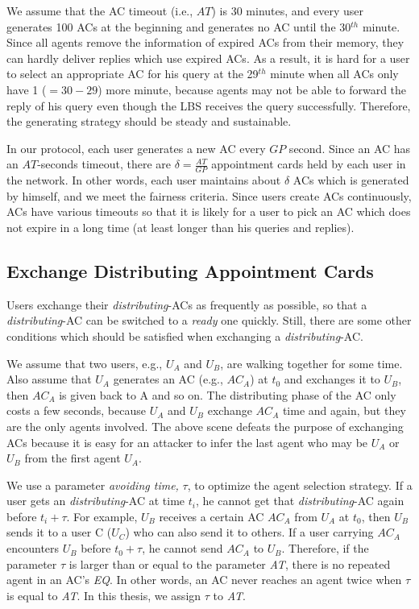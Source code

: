 \documentclass[conference]{IEEEtran}
\begin{document}
We assume that the AC timeout (i.e., $AT$) is 30 minutes, and every user generates 100 ACs at the beginning and generates no AC until the 30${}^{th}$ minute. Since all agents remove the information of expired ACs from their memory, they can hardly deliver replies which use expired ACs. As a result, it is hard for a user to select an appropriate AC for his query at the 29${}^{th}$ minute when all ACs only have 1 ($=30-29$) more minute, because agents may not be able to forward the reply of his query even though the LBS receives the query successfully. Therefore, the generating strategy should be steady and sustainable.

In our protocol, each user generates a new AC every $GP$ second. Since an AC has an $AT$-seconds timeout, there are $\delta =\frac{AT}{GP}$ appointment cards held by each user in the network. In other words, each user maintains about $\delta$ ACs which is generated by himself, and we meet the fairness criteria. Since users create ACs continuously, ACs have various timeouts so that it is likely for a user to pick an AC which does not expire in a long time (at least longer than his queries and replies).


\subsection{ Exchange Distributing Appointment Cards}\label{subsec_ExchangeDisAptCrd}

\noindent Users exchange their \textit{distributing}-ACs as frequently as possible, so that a \textit{distributing}-AC can be switched to a \textit{ready} one quickly. Still, there are some other conditions which should be satisfied when exchanging a \textit{distributing}-AC.

We assume that two users, e.g., $U_A$ and $U_B$, are walking together for some time. Also assume that $U_A$ generates an AC (e.g., ${AC}_A$) at $t_0$ and exchanges it to $U_B$, then ${AC}_A$ is given back to A and so on. The distributing phase of the AC only costs a few seconds, because $U_A$ and $U_B$ exchange ${AC}_A$ time and again, but they are the only agents involved. The above scene defeats the purpose of exchanging ACs because it is easy for an attacker to infer the last agent who may be $U_A$ or $U_B$ from the first agent $U_A$. 

We use a parameter \textit{avoiding time,} $\tau$, to optimize the agent selection strategy. If a user gets an \textit{distributing}-AC at time $t_i$, he cannot get that \textit{distributing}-AC again before $t_i+\tau $. For example, $U_B$ receives a certain AC ${AC}_A$ from $U_A$ at $t_0$, then $U_B$ sends it to a user C ($U_C$) who can also send it to others. If a user carrying ${AC}_A$ encounters $U_B$  before $t_0+\tau $, he cannot send ${AC}_A$ to $U_B$. Therefore, if the parameter $\tau $ is larger than or equal to the parameter \textit{AT}, there is no repeated agent in an AC's \textit{EQ}. In other words, an AC never reaches an agent twice when $\tau $ is equal to \textit{AT}. In this thesis, we assign $\tau $ to \textit{AT}. 
\end{document}
